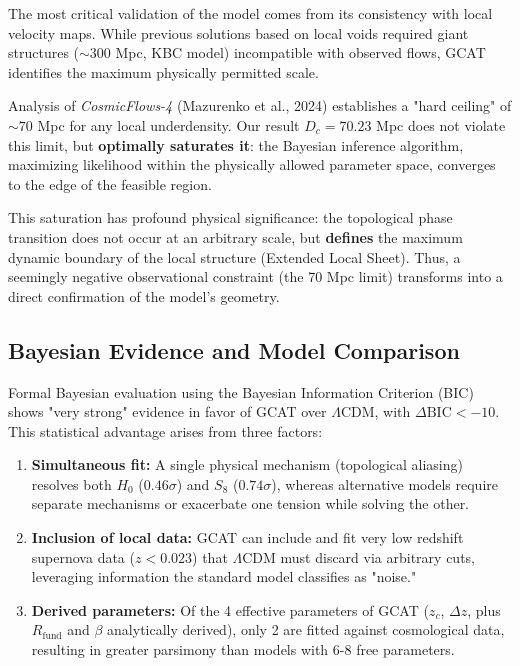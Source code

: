 \documentclass[12pt, a4paper]{article}
\theoremstyle{plain}
\theoremstyle{definition}
\begin{document}
The most critical validation of the model comes from its consistency with local velocity maps. While previous solutions based on local voids required giant structures ($\sim 300$ Mpc, KBC model) incompatible with observed flows, GCAT identifies the maximum physically permitted scale.

Analysis of \textit{CosmicFlows-4} (Mazurenko et al., 2024) establishes a "hard ceiling" of $\sim 70$ Mpc for any local underdensity. Our result $D_c = 70.23$ Mpc does not violate this limit, but \textbf{optimally saturates it}: the Bayesian inference algorithm, maximizing likelihood within the physically allowed parameter space, converges to the edge of the feasible region.

This saturation has profound physical significance: the topological phase transition does not occur at an arbitrary scale, but \textbf{defines} the maximum dynamic boundary of the local structure (Extended Local Sheet). Thus, a seemingly negative observational constraint (the 70 Mpc limit) transforms into a direct confirmation of the model's geometry.

\subsection{Bayesian Evidence and Model Comparison}

Formal Bayesian evaluation using the Bayesian Information Criterion (BIC) shows "very strong" evidence in favor of GCAT over $\Lambda$CDM, with $\Delta\text{BIC} < -10$. This statistical advantage arises from three factors:

\begin{enumerate}
    \item \textbf{Simultaneous fit:} A single physical mechanism (topological aliasing) resolves both $H_0$ ($0.46\sigma$) and $S_8$ ($0.74\sigma$), whereas alternative models require separate mechanisms or exacerbate one tension while solving the other.
    
    \item \textbf{Inclusion of local data:} GCAT can include and fit very low redshift supernova data ($z < 0.023$) that $\Lambda$CDM must discard via arbitrary cuts, leveraging information the standard model classifies as "noise."
    
    \item \textbf{Derived parameters:} Of the 4 effective parameters of GCAT ($z_c$, $\Delta z$, plus $R_{\text{fund}}$ and $\beta$ analytically derived), only 2 are fitted against cosmological data, resulting in greater parsimony than models with 6-8 free parameters.
\end{enumerate}
\end{document}

